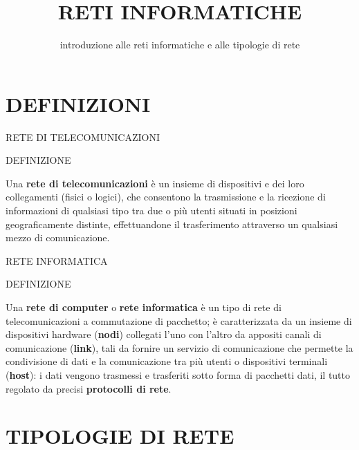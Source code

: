 \documentclass[aspectratio=1610]{beamer}
\title{RETI INFORMATICHE}
\subtitle{introduzione alle reti informatiche e alle tipologie di rete}
\date{}
\institute{\textit{
        Fonti:
        \begin{itemize}
            \item[-] \href{https://it.wikipedia.org/wiki/Rete_di_computer}{Wikipedia}
            \item[-] \href{https://www.cappellieditore.it/testi/skills-box/}{SkillsBox}
        \end{itemize}
    }
}
\begin{document}
\begin{frame}
    \titlepage
\end{frame}

\section{DEFINIZIONI}

\begin{frame}{RETE DI TELECOMUNICAZIONI}
    \begin{alertblock}{DEFINIZIONE}
        \begin{minipage}{0.98\linewidth}
            \justifying
            Una \textbf{rete di telecomunicazioni} è un insieme di dispositivi e dei loro collegamenti (fisici o logici),
            che consentono la trasmissione e la ricezione di informazioni di qualsiasi tipo tra due o più utenti situati 
            in posizioni geograficamente distinte, effettuandone il trasferimento attraverso un qualsiasi mezzo di comunicazione.
        \end{minipage}
    \end{alertblock}
\end{frame}

\begin{frame}{RETE INFORMATICA}
    \begin{alertblock}{DEFINIZIONE}
        \begin{minipage}{0.98\linewidth}
            \justifying
            Una \textbf{rete di computer} o \textbf{rete informatica} è un tipo di rete di telecomunicazioni a commutazione di pacchetto; 
            è caratterizzata da un insieme di dispositivi hardware (\textbf{nodi}) collegati l'uno con l'altro da appositi canali 
            di comunicazione (\textbf{link}), tali da fornire un servizio di comunicazione che permette la condivisione di dati e la 
            comunicazione tra più utenti o dispositivi terminali (\textbf{host}): i dati vengono trasmessi e trasferiti sotto forma di pacchetti 
            dati, il tutto regolato da precisi \textbf{protocolli di rete}.
        \end{minipage}
    \end{alertblock}
\end{frame}

\section{TIPOLOGIE DI RETE}
\end{document}
